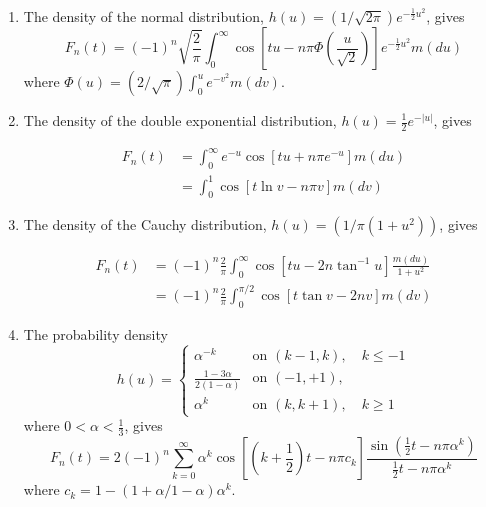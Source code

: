 \documentclass{article}
\begin{document}
\begin{enumerate}
  \item The density of the normal distribution, $h (u) = (1 / \sqrt{2 \pi})
  e^{- \frac{1}{2} u^2}$, gives
  \begin{equation}
    F_n (t) = (- 1)^n \sqrt{\frac{2}{\pi}}  \int_0^{\infty} \cos \left[ tu - n
    \pi \Phi \left( \frac{u}{\sqrt{2}} \right) \right] e^{- \frac{1}{2} u^2} m
    (du) \label{eq:Fn-normal}
  \end{equation}
  where $\Phi (u) = (2 / \sqrt{\pi})  \int_0^u e^{- v^2} m (dv)$.
  
  \item The density of the double exponential distribution, $h (u) =
  \frac{1}{2} e^{- |u|}$, gives
  
  \begin{align}
    F_n (t) & = \int_0^{\infty} e^{- u} \cos [tu + n \pi e^{- u}] m (du) \\
    & = \int_0^1 \cos [t \ln v - n \pi v] m (dv)  \label{eq:Fn-double-exp}
  \end{align}
  
  \item The density of the Cauchy distribution, $h (u) = (1 / \pi (1 + u^2))$,
  gives
  
  \begin{align}
    F_n (t) & = (- 1)^n \frac{2}{\pi}  \int_0^{\infty} \cos [tu - 2 n \tan^{-
    1} u]  \frac{m (du)}{1 + u^2} \\
    & = (- 1)^n \frac{2}{\pi}  \int_0^{\pi / 2} \cos [t \tan v - 2 nv] m (dv)
    \label{eq:Fn-cauchy}
  \end{align}
  
  \item The probability density
  \begin{equation}
    h (u) = \left\{ \begin{array}{ll}
      \alpha^{- k} & \text{on } (k - 1, k), \quad k \leqslant - 1\\
      \frac{1 - 3 \alpha}{2 (1 - \alpha)} & \text{on } (- 1, + 1),\\
      \alpha^k & \text{on } (k, k + 1), \quad k \geqslant 1
    \end{array} \right. \label{eq:h-custom}
  \end{equation}
  where $0 < \alpha < \frac{1}{3}$, gives
  \begin{equation}
    F_n (t) = 2 (- 1)^n  \sum_{k = 0}^{\infty} \alpha^k \cos \left[ \left( k +
    \frac{1}{2} \right) t - n \pi c_k \right]  \frac{\sin \left( \frac{1}{2} t
    - n \pi \alpha^k \right)}{\frac{1}{2} t - n \pi \alpha^k}
    \label{eq:Fn-custom}
  \end{equation}
  where $c_k = 1 - (1 + \alpha / 1 - \alpha) \alpha^k$.
  

\end{enumerate}
\end{document}
